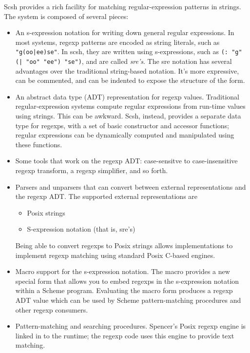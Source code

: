 Scsh provides a rich facility for matching regular-expression patterns 
in strings.
The system is composed of several pieces:
\begin{itemize}

\item An s-expression notation for writing down general regular expressions.
  In most systems, regexp patterns are encoded as string literals, such
  as \verb+"g(oo|ee)se"+. 
  In scsh, they are written using s-expressions, such as
      \verb+(: "g" (| "oo" "ee") "se")+, and are called \emph{sre's}. 
  The sre notation has several
  advantages over the traditional string-based notation. It's more expressive,
  can be commented, and can be indented to expose the structure of the form.

\item An abstract data type (ADT) representation for regexp values.
  Traditional regular-expression systems compute regular expressions
  from run-time values using strings. This can be awkward. Scsh, instead,
  provides a separate data type for regexps, with a set of basic constructor
  and accessor functions; regular expressions can be dynamically computed
  and manipulated using these functions.

\item Some tools that work on the regexp ADT: case-sensitve to case-insensitive
  regexp transform, a regexp simplifier, and so forth.

\item Parsers and unparsers that can convert between external representations
  and the regexp ADT. The supported external representations are
  \begin{itemize}
      \item Posix strings
      \item S-expression notation (that is, sre's)
  \end{itemize}
  Being able to convert regexps to Posix strings allows implementations
  to implement regexp matching using standard Posix C-based engines.

\item Macro support for the s-expression notation.
  The  macro provides a new special form that allows you to embed
  regexps in the s-expression notation within a Scheme program. Evaluating
  the macro form produces a regexp ADT value which can be used by
  Scheme pattern-matching procedures and other regexp consumers.

\item Pattern-matching and searching procedures.
  Spencer's Posix regexp engine is linked in to the runtime; the
  regexp code uses this engine to provide text matching.
\end{itemize}
  
